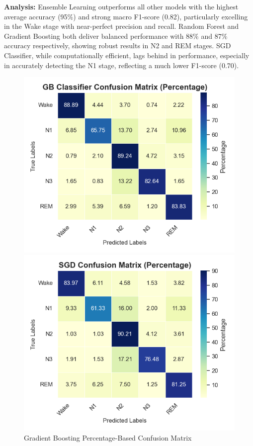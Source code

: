 \textbf{Analysis:} Ensemble Learning outperforms all other models with the highest average accuracy (95\%) and strong macro F1-score (0.82), particularly excelling in the Wake stage with near-perfect precision and recall. Random Forest and Gradient Boosting both deliver balanced performance with 88\% and 87\% accuracy respectively, showing robust results in N2 and REM stages. SGD Classifier, while computationally efficient, lags behind in performance, especially in accurately detecting the N1 stage, reflecting a much lower F1-score (0.70).





\begin{figure}[H]
	\centering
	\begin{minipage}[t]{0.48\textwidth}
		\centering
		\includegraphics[width=\textwidth]{img/paper_1/GB Classifier_percentage_based.png}
		\caption{Gradient Boosting Percentage-Based Confusion Matrix}
	\end{minipage}
	\hfill
	\begin{minipage}[t]{0.48\textwidth}
		\centering
		\includegraphics[width=\textwidth]{img/paper_1/SGD_percentage_based.png}

\end{minipage}
\end{figure}
